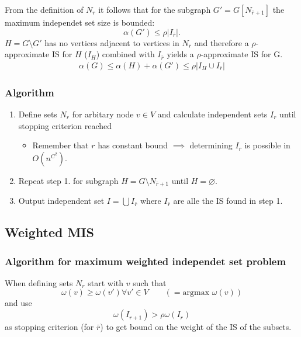 \documentclass{beamer}
\begin{document}
\begin{frame}
From the definition of $N_r$ it follows that for the subgraph $G' = G[N_{\bar r+1}]$ the maximum independet set size is bounded:
\begin{equation*}
\alpha(G') \leq \rho|I_{\bar r}|.
\end{equation*}
$H = G\setminus G'$ has no vertices adjacent to vertices in $N_{\bar r}$ and therefore a $\rho$-approximate IS for $H$ ($I_H$) combined with $I_{\bar r}$ yields a $\rho$-approximate IS for G.
\begin{align*}
\alpha(G) \leq \alpha(H) + \alpha(G') \leq \rho|I_H \cup I_{\bar r}|
\end{align*}
\end{frame}

\begin{frame}
\frametitle{Algorithm}
\begin{enumerate}
\item Define sets $N_r$ for arbitary node $v \in V$ and calculate independent sets $I_r$ until stopping criterion reached
\begin{itemize}
\item Remember that $r$ has constant bound $\implies$ determining $I_r$ is possible in $O(n^{C^2})$.
\end{itemize}
\item Repeat step 1. for subgraph $H= G \setminus N_{\bar r +1}$ until $H = \varnothing$.
\item Output independent set $I = \bigcup I_{\bar r}$ where $I_{\bar r}$ are alle the IS found in step 1. 
\end{enumerate}
\end{frame}

\subsection{Weighted MIS}
\begin{frame}
\frametitle{Algorithm for maximum weighted independet set problem}
When defining sets $N_r$ start with $v$ such that 
\begin{equation*}
\omega(v) \geq \omega(v') \forall v' \in V \qquad (=\text{argmax } \omega(v)) 
\end{equation*}and use
\begin{equation*}
\omega(I_{r+1}) > \rho \omega(I_r)
\end{equation*}as stopping criterion (for $\bar r$) to get bound on the weight of the IS of the subsets.
\end{frame}
\end{document}
